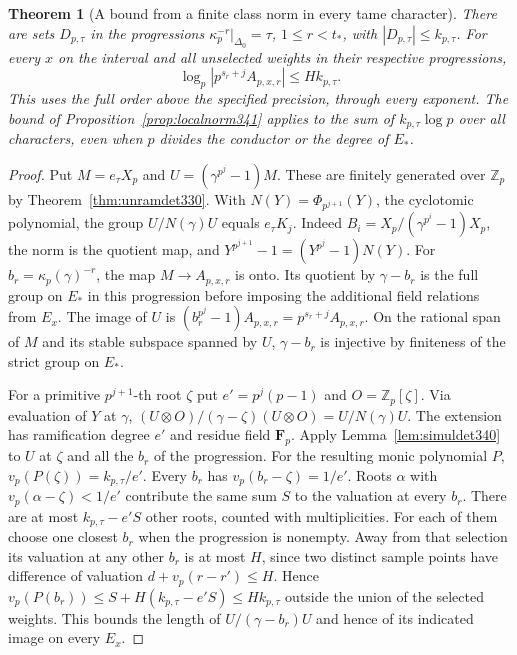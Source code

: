 \documentclass[a4paper,11pt]{article}
\newtheorem{theorem}[proposition]{Theorem}
\theoremstyle{definition}
\theoremstyle{remark}
\newcommand{\ZZ}{\mathbb Z}\newcommand{\ord}{\operatorname{ord}}
\numberwithin{equation}{section}
\begin{document}
\begin{theorem}[A bound from a finite class norm in every tame character]\leavevmode\label{thm:fullnorm341}
There are sets $D_{p,\tau}$ in the progressions
$\kappa_p^{-r}|_{\Delta_0}=\tau$, $1\le r<t_*$, with
$|D_{p,\tau}|\le k_{p,\tau}$. For every $x$ on the interval and
all unselected weights in their respective progressions,
\[
             \log_p|p^{s_r+j} A_{p,x,r}|\le H k_{p,\tau} .
\]
This uses the full order above the specified precision, through every
exponent. The bound of Proposition~\ref{prop:localnorm341} applies
to the sum of $k_{p,\tau}\log p$ over all characters, even when
$p$ divides the conductor or the degree of $E_*$.
\end{theorem}
\begin{proof}
Put $M=e_\tau X_p$ and $U=(\gamma^{p^j}-1)M$. These are finitely
generated over $\ZZ_p$ by Theorem~\ref{thm:unramdet330}. With
$N(Y)=\Phi_{p^{j+1}}(Y)$, the cyclotomic polynomial, the group
$U/N(\gamma)U$ equals $e_\tau K_j$. Indeed
$B_i=X_p/(\gamma^{p^i}-1)X_p$, the norm is the quotient map, and
$Y^{p^{j+1}}-1=(Y^{p^j}-1)N(Y)$. For $b_r=\kappa_p(\gamma)^{-r}$,
the map $M\to A_{p,x,r}$ is onto. Its quotient by $\gamma-b_r$
is the full group on $E_*$ in this progression before imposing
the additional field relations from $E_x$. The image of $U$ is
$(b_r^{p^j}-1)A_{p,x,r}=p^{s_r+j}A_{p,x,r}$. On the rational span
of $M$ and its stable subspace spanned by $U$, $\gamma-b_r$ is
injective by finiteness of the strict group on $E_*$.

For a primitive $p^{j+1}$-th root $\zeta$ put
$e'=p^j(p-1)$ and $O=\ZZ_p[\zeta]$. Via evaluation of $Y$ at
$\gamma$, $(U\otimes O)/(\gamma-\zeta)(U\otimes O)=U/N(\gamma)U$.
The extension has ramification degree $e'$ and residue field
$\mathbf F_p$. Apply Lemma~\ref{lem:simuldet340} to $U$ at $\zeta$
and all the $b_r$ of the progression. For the resulting monic
polynomial $P$, $v_p(P(\zeta))=k_{p,\tau}/e'$. Every $b_r$ has
$v_p(b_r-\zeta)=1/e'$. Roots $\alpha$ with
$v_p(\alpha-\zeta)<1/e'$ contribute the same sum $S$ to the
valuation at every $b_r$. There are at most $k_{p,\tau}-e'S$ other
roots, counted with multiplicities. For each of them choose one
closest $b_r$ when the progression is nonempty. Away from that
selection its valuation at any other $b_r$ is at most $H$, since
two distinct sample points have difference of valuation
$d+v_p(r-r')\le H$. Hence $v_p(P(b_r))\le S+H(k_{p,\tau}-e'S)
\le Hk_{p,\tau}$ outside the union of the selected weights. This
bounds the length of $U/(\gamma-b_r)U$ and hence of its indicated
image on every $E_x$.
\end{proof}
\end{document}
